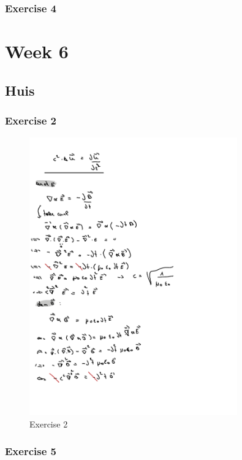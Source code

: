 \documentclass[a4paper]{report}
\begin{document}
\subsubsection{Exercise 4}



\section{Week 6}

\subsection{Huis}

\subsubsection{Exercise 2}

\begin{figure}[H]
	\centering
	\includegraphics[width=0.8\textwidth]{assets/huis_6_ex_2.pdf}
	\caption{Exercise 2}
	\label{fig:huis_6_ex_2}
\end{figure}

\subsubsection{Exercise 5}
\end{document}
